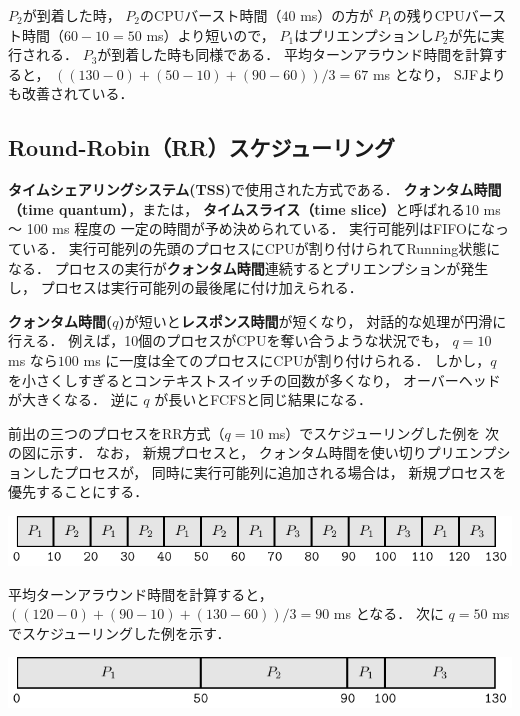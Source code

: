 $P_2$が到着した時，
$P_2$のCPUバースト時間（$40$ ms）の方が
$P_1$の残りCPUバースト時間（$60 - 10 = 50$ ms）より短いので，
$P_1$はプリエンプションし$P_2$が先に実行される．
$P_3$が到着した時も同様である．
平均ターンアラウンド時間を計算すると，
$((130-0)+(50-10)+(90-60))/3=67$ ms となり，
SJFよりも改善されている．

\subsection{Round-Robin（RR）スケジューリング}
{\bf タイムシェアリングシステム(TSS)}で使用された方式である．
{\bf クォンタム時間（time quantum）}，または，
{\bf タイムスライス（time slice）}と呼ばれる10 ms 〜 100 ms 程度の
一定の時間が予め決められている．
実行可能列はFIFOになっている．
実行可能列の先頭のプロセスにCPUが割り付けられてRunning状態になる．
プロセスの実行が{\bf クォンタム時間}連続するとプリエンプションが発生し，
プロセスは実行可能列の最後尾に付け加えられる．

{\bf クォンタム時間($q$)}が短いと{\bf レスポンス時間}が短くなり，
対話的な処理が円滑に行える．
例えば，10個のプロセスがCPUを奪い合うような状況でも，
$q = 10$ ms なら$100$ ms に一度は全てのプロセスにCPUが割り付けられる．
しかし，$q$ を小さくしすぎるとコンテキストスイッチの回数が多くなり，
オーバーヘッドが大きくなる．
逆に $q$ が長いとFCFSと同じ結果になる．

前出の三つのプロセスをRR方式（$q = 10$ ms）でスケジューリングした例を
次の図に示す．
なお，
新規プロセスと，
クォンタム時間を使い切りプリエンプションしたプロセスが，
同時に実行可能列に追加される場合は，
新規プロセスを優先することにする．

\begin{center}
\includegraphics[scale=1.0]{GanntChart/rr1.pdf}
\end{center}

平均ターンアラウンド時間を計算すると，
$((120-0)+(90-10)+(130-60))/3=90$ ms となる．
次に $q = 50$ ms でスケジューリングした例を示す．

\begin{center}
\includegraphics[scale=1.0]{GanntChart/rr2.pdf}
\end{center}

